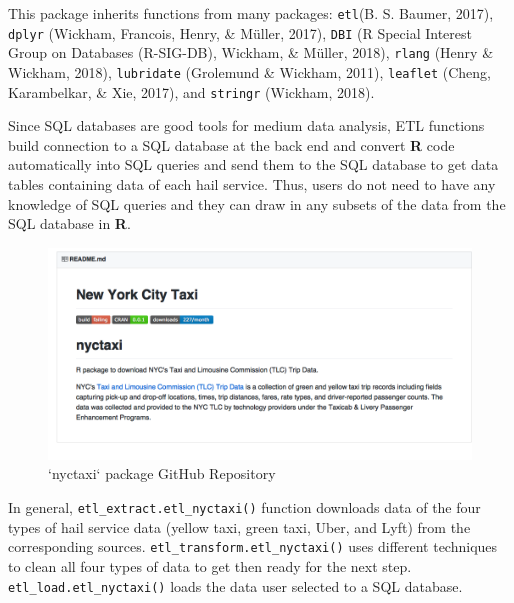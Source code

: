 \documentclass[12pt,twoside]{reedthesis}
\theoremstyle{definition}
\theoremstyle{definition}
\theoremstyle{definition}
\theoremstyle{remark}
\begin{document}
This package inherits functions from many packages: \texttt{etl}(B. S.
Baumer, 2017), \texttt{dplyr} (Wickham, Francois, Henry, \& Müller,
2017), \texttt{DBI} (R Special Interest Group on Databases (R-SIG-DB),
Wickham, \& Müller, 2018), \texttt{rlang} (Henry \& Wickham, 2018),
\texttt{lubridate} (Grolemund \& Wickham, 2011), \texttt{leaflet}
(Cheng, Karambelkar, \& Xie, 2017), and \texttt{stringr} (Wickham,
2018).

Since SQL databases are good tools for medium data analysis, ETL
functions build connection to a SQL database at the back end and convert
\textbf{R} code automatically into SQL queries and send them to the SQL
database to get data tables containing data of each hail service. Thus,
users do not need to have any knowledge of SQL queries and they can draw
in any subsets of the data from the SQL database in \textbf{R}.
\begin{figure}

{\centering \includegraphics[width=5.88in]{figure/nyctaxi-page} 

}

\caption{`nyctaxi` package GitHub Repository}\label{fig:nyctaxi-page}
\end{figure}
In general, \texttt{etl\_extract.etl\_nyctaxi()} function downloads data
of the four types of hail service data (yellow taxi, green taxi, Uber,
and Lyft) from the corresponding sources.
\texttt{etl\_transform.etl\_nyctaxi()} uses different techniques to
clean all four types of data to get then ready for the next step.
\texttt{etl\_load.etl\_nyctaxi()} loads the data user selected to a SQL
database.
\end{document}
